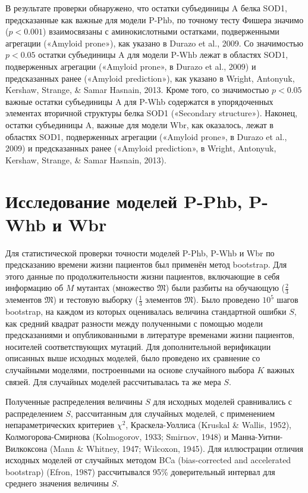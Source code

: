 В результате проверки обнаружено, что остатки субъединицы A белка SOD1, предсказанные как важные для модели P-Phb, по точному тесту Фишера значимо ($p < 0.001$) взаимосвязаны с аминокислотными остатками, подверженными агрегации («Amyloid prone»), как указано в Durazo et al., 2009. Со значимостью $p < 0.05$ остатки субъединицы A для модели P-Whb лежат в областях SOD1, подверженных агрегации («Amyloid prone», в Durazo et al., 2009) и предсказанных ранее («Amyloid prediction»), как указано в Wright, Antonyuk, Kershaw, Strange, \& Samar Hasnain, 2013. Кроме того, со значимостью $p < 0.05$ важные остатки субъединицы A для P-Whb содержатся в упорядоченных элементах вторичной структуры белка SOD1 («Secondary structure»). Наконец, остатки субъединицы A, важные для модели Wbr, как оказалось, лежат в областях SOD1, подверженных агрегации («Amyloid prone», в Durazo et al., 2009) и предсказанных ранее («Amyloid prediction», в Wright, Antonyuk, Kershaw, Strange, \& Samar Hasnain, 2013).

\section{Исследование моделей P-Phb, P-Whb и Wbr} \label{sect_MD_analysis}

Для статистической проверки точности моделей P-Phb, P-Whb и Wbr по предсказанию времени жизни пациентов был применён метод bootstrap. Для этого данные по продолжительности жизни пациентов, включающие в себя информацию об $M$ мутантах (множество $\mathfrak{M}$) были разбиты на обучающую ($\frac{2}{3}$ элементов $\mathfrak{M}$) и тестовую выборку ($\frac{1}{3}$ элементов $\mathfrak{M}$). Было проведено $10^5$ шагов bootstrap, на каждом из которых оценивалась величина стандартной ошибки $S$, как средний квадрат разности между полученными с помощью модели предсказаниями и опубликованными в литературе временами жизни пациентов, носителей соответствующих мутаций.
Для дополнительной верификации описанных выше исходных моделей, было проведено их сравнение со случайными моделями, построенными на основе случайного выбора $K$ важных связей. Для случайных моделей рассчитывалась та же мера $S$.

Полученные распределения величины $S$ для исходных моделей сравнивались с распределением $S$, рассчитанным для случайных моделей, с применением непараметрических критериев $\chi^2$, Краскела-Уоллиса (Kruskal \& Wallis, 1952), Колмогорова-Смирнова (Kolmogorov, 1933; Smirnov, 1948) и Манна-Уитни-Вилкоксона (Mann \& Whitney, 1947; Wilcoxon, 1945). Для иллюстрации отличия исходных моделей от случайных методом BCa (bias-corrected and accelerated bootstrap) (Efron, 1987) рассчитывался 95\% доверительный интервал для среднего значения величины $S$.


